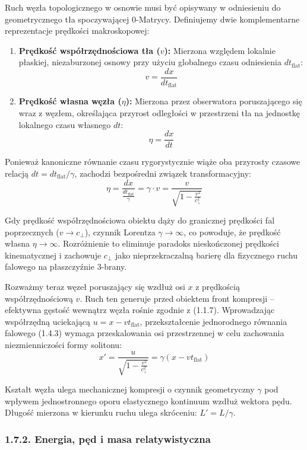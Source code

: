 \documentclass[
  letterpaper,
  DIV=11,
  numbers=noendperiod]{scrartcl}
\numberwithin{equation}{subsection}
\begin{document}
Ruch węzła topologicznego w osnowie musi być opisywany w odniesieniu do
geometrycznego tła spoczywającej 0-Matrycy. Definiujemy dwie
komplementarne reprezentacje prędkości makroskopowej:

\begin{enumerate}
\def\labelenumi{\arabic{enumi}.}
\item
  \textbf{Prędkość współrzędnościowa tła (\(v\)):} Mierzona względem
  lokalnie płaskiej, niezaburzonej osnowy przy użyciu globalnego czasu
  odniesienia \(dt_{\text{flat}}\):
  \[v = \frac{dx}{dt_{\text{flat}}} \tag{1.7.1a}\]
\item
  \textbf{Prędkość własna węzła (\(\eta\)):} Mierzona przez obserwatora
  poruszającego się wraz z węzłem, określająca przyrost odległości w
  przestrzeni tła na jednostkę lokalnego czasu własnego \(dt\):
  \[\eta = \frac{dx}{dt} \tag{1.7.1b}\]
\end{enumerate}

Ponieważ kanoniczne równanie czasu rygorystycznie wiąże oba przyrosty
czasowe relacją \(dt = dt_{\text{flat}} / \gamma\), zachodzi bezpośredni
związek transformacyjny:
\[\eta = \frac{dx}{\frac{dt_{\text{flat}}}{\gamma}} = \gamma \cdot v = \frac{v}{\sqrt{1 - \frac{v^2}{c_{\perp}^2}}} \tag{1.7.1c}\]

Gdy prędkość współrzędnościowa obiektu dąży do granicznej prędkości fal
poprzecznych (\(v \to c_{\perp}\)), czynnik Lorentza
\(\gamma \to \infty\), co powoduje, że prędkość własna
\(\eta \to \infty\). Rozróżnienie to eliminuje paradoks nieskończonej
prędkości kinematycznej i zachowuje \(c_{\perp}\) jako nieprzekraczalną
barierę dla fizycznego ruchu falowego na płaszczyźnie 3-brany.

Rozważmy teraz węzeł poruszający się wzdłuż osi \(x\) z prędkością
współrzędnościową \(v\). Ruch ten generuje przed obiektem front
kompresji -- efektywna gęstość wewnątrz węzła rośnie zgodnie z (1.1.7).
Wprowadzając współrzędną uciekającą \(u = x - vt_{\text{flat}}\),
przekształcenie jednorodnego równania falowego (1.4.3) wymaga
przeskalowania osi przestrzennej w celu zachowania niezmienniczości
formy solitonu:
\[x' = \frac{u}{\sqrt{1 - \frac{v^2}{c_{\perp}^2}}} = \gamma (x - vt_{\text{flat}}) \tag{1.7.1d}\]

Kształt węzła ulega mechanicznej kompresji o czynnik geometryczny
\(\gamma\) pod wpływem jednostronnego oporu elastycznego kontinuum
wzdłuż wektora pędu. Długość mierzona w kierunku ruchu ulega skróceniu:
\(L' = L / \gamma\).

\subsubsection{1.7.2. Energia, pęd i masa
relatywistyczna}\label{energia-pux119d-i-masa-relatywistyczna}
\end{document}
